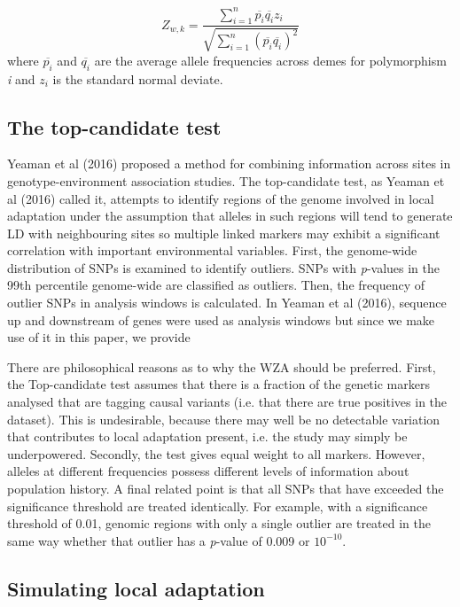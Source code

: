 \documentclass[11pt,twoside,lineno]{GSA_format}
\begin{document}
\begin{equation}
\label{weightedZ}
Z_{w,k} =  \frac {\sum\limits_{i=1}^n \overline{p_i} \overline{q_i}z_i}{\sqrt{ \sum\limits_{i=1}^n (\overline{p_i}\overline{q_i})^2} }
\end{equation}
where $\overline{p_i}$ and $\overline{q_i}$ are the average allele frequencies across demes for polymorphism \textit{i} and $z_i$ is the standard normal deviate.



\subsection{The top-candidate test} 

Yeaman et al (2016) proposed a method for combining information across sites in genotype-environment association studies. The top-candidate test, as Yeaman et al (2016)  called it, attempts to identify regions of the genome involved in local adaptation under the assumption that alleles in such regions will tend to generate LD with neighbouring sites so multiple linked markers may exhibit a significant correlation with important environmental variables. First, the genome-wide distribution of SNPs is examined to identify outliers. SNPs with \textit{p}-values in the 99th percentile genome-wide are classified as outliers. Then, the frequency of outlier SNPs in analysis windows is calculated. In Yeaman et al (2016), sequence up and downstream of genes were used as analysis windows
 but since we make use of it in this paper, we provide 

There are philosophical reasons as to why the WZA should be preferred. First, the Top-candidate test assumes that there is a fraction of the genetic markers analysed that are tagging causal variants (i.e. that there are true positives in the dataset). This is undesirable, because there may well be no detectable variation that contributes to local adaptation present, i.e. the study may simply be underpowered. Secondly, the test gives equal weight to all markers. However, alleles at different frequencies possess different levels of information about population history. A final related point is that all SNPs that have exceeded the significance threshold are treated identically. For example, with a significance threshold of 0.01, genomic regions with only a single outlier are treated in the same way whether that outlier has a \textit{p}-value of 0.009 or $10^{-10}$.

\subsection{Simulating local adaptation} 
\end{document}

